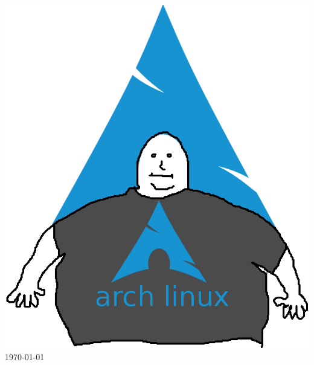 \begin{titlepage}
\begin{center}
            \includegraphics[scale=0.3]{Img/title.jpg}\\[1.5cm]
            \vspace*{1\baselineskip}
            \today \\[0.7cm]
        \end{center}
    \end{titlepage}
    \tableofcontents
    \clearpage 

 

    

